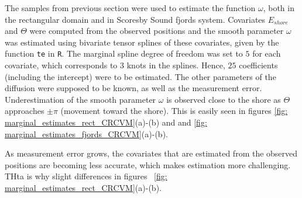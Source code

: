 \documentclass[11pt]{article}
\newcommand {\1}{\mathbb{1}}
\begin{document}
The samples from previous section were used to estimate the function $\omega$, both in the rectangular domain and in Scoresby Sound fjords system. Covariates $E_{shore}$ and $\Theta$ were computed from the observed positions and the smooth parameter $\omega$ was estimated using bivariate tensor splines of these covariates, given by the function \texttt{te} in \texttt{R}. The marginal spline degree of freedom was set to $5$ for each covariate, which corresponds to $3$ knots in the splines. Hence, $25$ coefficients (including the intercept) were to be estimated. The other parameters of the diffusion were supposed to be known, as well as the measurement error. Underestimation of the smooth parameter $\omega$ is observed close to the shore as $\Theta$ approaches $\pm \pi$ (movement toward the shore). This is easily seen in figures \ref{fig: marginal_estimates_rect_CRCVM}(a)-(b) and and \ref{fig: marginal_estimates_fjords_CRCVM}(a)-(b).


As measurement error grows, the covariates that are estimated from the observed positions are becoming less accurate, which makes estimation more challenging. THta is why slight differences in figures ~\ref{fig: marginal_estimates_rect_CRCVM}(a)-(b).
\end{document}
